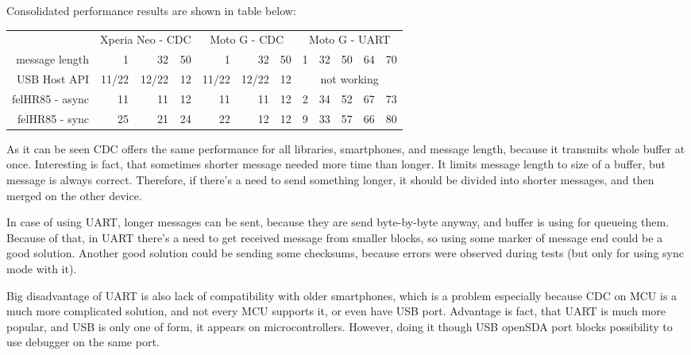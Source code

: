 Consolidated performance results are shown in table below:
\begin{center}
\begin{tabular}{r|r|r|r|r|r|r|r|r|r|r|r}
& \multicolumn{3}{c|}{Xperia Neo - CDC} & \multicolumn{3}{c|}{Moto G - CDC} &
\multicolumn{5}{c}{Moto G - UART} \\
message length & 1 & 32 & \hspace{3ex}50 & 
1 & 32 & \hspace{3ex}50 & \hspace{1ex}1 & 
32 & 50 & 64 & 70
\\
\hline
USB Host API & 
11/22 & 12/22 & 12 & 11/22 & 12/22 & 12 &
\multicolumn{5}{c}{\cellcolor{red!50}not working}
\\
felHR85 - async & 
11 & 11 & 12 & 11 & 11 & 12 & 2 & 34 & 52 & 67 & 73 \\
felHR85 - sync & 
25 & 21 & 24 & 22 & 12 & 12 &
9 & 33 & \cellcolor{yellow!50}57 & 66 & \cellcolor{yellow!50}80
\end{tabular}
\end{center}

As it can be seen CDC offers the same performance for all libraries,
smartphones, and message length, because it transmits whole buffer at once.
Interesting is fact, that sometimes shorter message needed more time than
longer.
It limits message length to size of a buffer, but message is always correct.
Therefore, if there's a need to send something longer, it should be divided into
shorter messages, and then merged on the other device.

In case of using UART, longer messages can be sent, because they are send
byte-by-byte anyway, and buffer is using for queueing them.
Because of that, in UART there's a need to get received message from smaller
blocks, so using some marker of message end could be a good solution.
Another good solution could be sending some checksums, because errors were
observed during tests (but only for using sync mode with it).

Big disadvantage of UART is also lack of compatibility with older smartphones,
which is a problem especially because CDC on MCU is a much more complicated
solution, and not every MCU supports it, or even have USB port.
Advantage is fact, that UART is much more popular, and USB is only one of form,
it appears on microcontrollers.
However, doing it though USB openSDA port blocks possibility to use debugger on
the same port.

